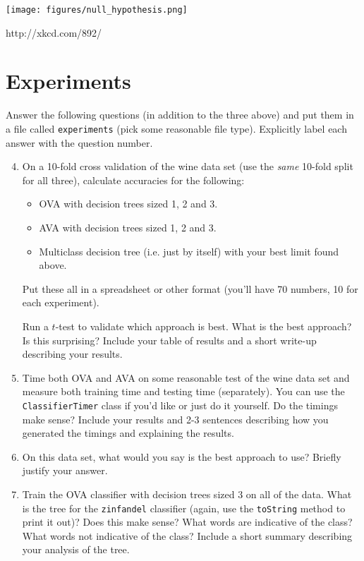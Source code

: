 \documentclass[11pt]{article}
\begin{document}
\begin{center}
\texttt{[image: figures/null\_hypothesis.png]}

{\footnotesize http://xkcd.com/892/}
\end{center}

\section{Experiments}
\label{evaluation}


Answer the following questions (in addition to the three above) and put them in a file called \texttt{experiments} (pick some reasonable file type).  Explicitly label each answer with the question number.

\begin{enumerate}

\setcounter{enumi}{3}

\item On a 10-fold cross validation of the wine data set (use the \emph{same} 10-fold split for all three), calculate accuracies for the following:

\begin{itemize}

\item OVA with decision trees sized 1, 2 and 3.

\item AVA with decision trees sized 1, 2 and 3.

\item Multiclass decision tree (i.e. just by itself) with your best limit found above.

\end{itemize}

Put these all in a spreadsheet or other format (you'll have 70 numbers, 10 for each experiment).

Run a $t$-test to validate which approach is best.  What is the best approach?  Is this surprising?  Include your table of results and a short write-up describing your results.

\item Time both OVA and AVA on some reasonable test of the wine data set and measure both training time and testing time (separately).  You can use the \texttt{ClassifierTimer} class if you'd like or just do it yourself.  Do the timings make sense?  Include your results and 2-3 sentences describing how you generated the timings and explaining the results. 

\item On this data set, what would you say is the best approach to use?  Briefly justify your answer.

\item Train the OVA classifier with decision trees sized 3 on all of the data.  What is the tree for the \texttt{zinfandel} classifier (again, use the \texttt{toString} method to print it out)?  Does this make sense?  What words are indicative of the class? What words not indicative of the class?  Include a short summary describing your analysis of the tree.

\end{enumerate}
\end{document}
